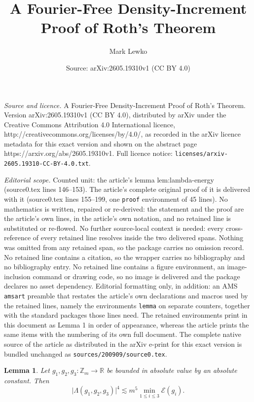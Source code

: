\documentclass[10pt,a4paper]{amsart}
\title{A Fourier-Free Density-Increment Proof of Roth's Theorem}
\author{Mark Lewko}
\date{Source: arXiv:2605.19310v1 (CC BY 4.0)}
\newtheorem{lemma}{Lemma}
\newcommand{\Z}{\mathbb{Z}}
\newcommand{\abs}[1]{\lvert#1\rvert}
\begin{document}
\maketitle

\noindent\emph{Source and licence.} A Fourier-Free Density-Increment Proof of Roth's Theorem. Version arXiv:2605.19310v1 (CC BY 4.0), distributed by arXiv under the Creative Commons Attribution 4.0 International licence, http://creativecommons.org/licenses/by/4.0/, as recorded in the arXiv licence metadata for this exact version and shown on the abstract page https://arxiv.org/abs/2605.19310v1. Full licence notice: \texttt{licenses/arxiv-2605.19310-CC-BY-4.0.txt}.\par\smallskip

\noindent\textit{Editorial scope.} Counted unit: the article's lemma lem:lambda-energy (source0.tex lines 146--153). The article's complete original proof of it is delivered with it (source0.tex lines 155--199, one \texttt{proof} environment of 45 lines). No mathematics is written, repaired or re-derived: the statement and the proof are the article's own lines, in the article's own notation, and no retained line is substituted or re-flowed.  No further source-local context is needed: every cross-reference of every retained line resolves inside the two delivered spans.  Nothing was omitted from any retained span, so the package carries no omission record.  No retained line contains a citation, so the wrapper carries no bibliography and no bibliography entry.  No retained line contains a figure environment, an image-inclusion command or drawing code, so no image is delivered and the package declares no asset dependency.  Editorial formatting only, in addition: an AMS \texttt{amsart} preamble that restates the article's own declarations and macros used by the retained lines, namely the environments \texttt{lemma} on separate counters, together with the standard packages those lines need.  The retained environments print in this document as Lemma 1 in order of appearance, whereas the article prints the same items with the numbering of its own full document.  The complete native source of the article as distributed in the arXiv e-print for this exact version is bundled unchanged as \texttt{sources/200909/source0.tex}.
\begin{lemma}\label{lem:lambda-energy}
Let $g_1,g_2,g_3\colon\Z_m\to\mathbb R$ be bounded in absolute value by an
absolute constant. Then
\[
        \abs{\Lambda(g_1,g_2,g_3)}^4
        \lesssim m^5\min_{1\leq i\leq3}\mathcal E(g_i).
\]
\end{lemma}
\end{document}
